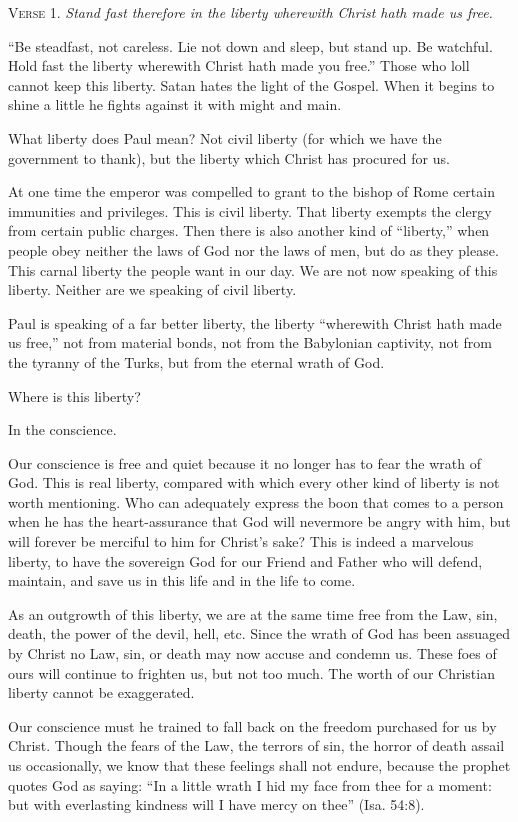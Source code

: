 \textsc{Verse} 1. \emph{Stand fast therefore in the liberty wherewith Christ hath made us free.}

“Be steadfast, not careless. Lie not down and sleep, but stand up. Be watchful. Hold fast the liberty wherewith Christ hath made you free.” Those who loll cannot keep this liberty. Satan hates the light of the Gospel. When it begins to shine a little he fights against it with might and main.

What liberty does Paul mean? Not civil liberty (for which we have the government to thank), but the liberty which Christ has procured for us.

At one time the emperor was compelled to grant to the bishop of Rome certain immunities and privileges. This is civil liberty. That liberty exempts the clergy from certain public charges. Then there is also another kind of “liberty,” when people obey neither the laws of God nor the laws of men, but do as they please. This carnal liberty the people want in our day. We are not now speaking of this liberty. Neither are we speaking of civil liberty.

Paul is speaking of a far better liberty, the liberty “wherewith Christ hath made us free,” not from material bonds, not from the Babylonian captivity, not from the tyranny of the Turks, but from the eternal wrath of God.

Where is this liberty?

In the conscience.

Our conscience is free and quiet because it no longer has to fear the wrath of God. This is real liberty, compared with which every other kind of liberty is not worth mentioning. Who can adequately express the boon that comes to a person when he has the heart-assurance that God will nevermore be angry with him, but will forever be merciful to him for Christ’s sake? This is indeed a marvelous liberty, to have the sovereign God for our Friend and Father who will defend, maintain, and save us in this life and in the life to come.

As an outgrowth of this liberty, we are at the same time free from the Law, sin, death, the power of the devil, hell, etc. Since the wrath of God has been assuaged by Christ no Law, sin, or death may now accuse and condemn us. These foes of ours will continue to frighten us, but not too much. The worth of our Christian liberty cannot be exaggerated.

Our conscience must he trained to fall back on the freedom purchased for us by Christ. Though the fears of the Law, the terrors of sin, the horror of death assail us occasionally, we know that these feelings shall not endure, because the prophet quotes God as saying: “In a little wrath I hid my face from thee for a moment: but with everlasting kindness will I have mercy on thee” (Isa. 54:8).


